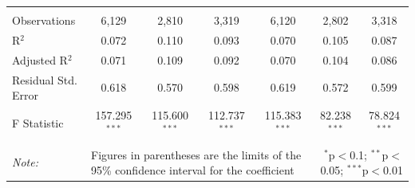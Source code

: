 \documentclass[alpha-refs]{wiley-article-01g}
\begin{document}
\begin{landscape}
\begin{table}[!htbp]
\begin{tabular}{@{\extracolsep{5pt}}lcccccc}
  & & & & & & \\ 
\hline \\[-3ex] 
Observations & 6,129 & 2,810 & 3,319 & 6,120 & 2,802 & 3,318 \\ 
R$^{2}$ & 0.072 & 0.110 & 0.093 & 0.070 & 0.105 & 0.087 \\ 
Adjusted R$^{2}$ & 0.071 & 0.109 & 0.092 & 0.070 & 0.104 & 0.086 \\ 
Residual Std. Error & 0.618 & 0.570 & 0.598 & 0.619 & 0.572 & 0.599 \\ 
F Statistic & 157.295$^{***}$ & 115.600$^{***}$ & 112.737$^{***}$ & 115.383$^{***}$ & 82.238$^{***}$ & 78.824$^{***}$ \\ 
\hline 
\hline \\[-3ex] 
\textit{Note:} &\multicolumn{4}{l}{Figures in parentheses are the limits of the 95\% confidence interval for the coefficient}  & \multicolumn{2}{r}{$^{*}$p$<$0.1; $^{**}$p$<$0.05; $^{***}$p$<$0.01} \\ 
\end{tabular} 
\end{table} 

\end{landscape}

\newpage
\end{document}
